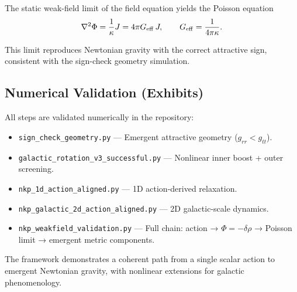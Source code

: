 \documentclass[11pt,a4paper]{article}
\begin{document}
The static weak-field limit of the field equation yields the Poisson equation
\begin{equation}
\nabla^2 \Phi = \frac{1}{\kappa} J = 4\pi G_{\rm eff} \, J, \qquad G_{\rm eff} = \frac{1}{4\pi \kappa}.
\end{equation}

This limit reproduces Newtonian gravity with the correct attractive sign, consistent with the sign-check geometry simulation.

\subsection{Numerical Validation (Exhibits)}
All steps are validated numerically in the repository:

\begin{itemize}
\item \texttt{sign\_check\_geometry.py} — Emergent attractive geometry (\(g_{rr} < g_{tt}\)).
\item \texttt{galactic\_rotation\_v3\_successful.py} — Nonlinear inner boost + outer screening.
\item \texttt{nkp\_1d\_action\_aligned.py} — 1D action-derived relaxation.
\item \texttt{nkp\_galactic\_2d\_action\_aligned.py} — 2D galactic-scale dynamics.
\item \texttt{nkp\_weakfield\_validation.py} — Full chain: action → \(\Phi = -\delta\rho\) → Poisson limit → emergent metric components.
\end{itemize}

The framework demonstrates a coherent path from a single scalar action to emergent Newtonian gravity, with nonlinear extensions for galactic phenomenology.
\end{document}

